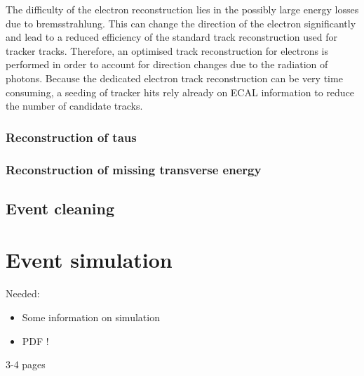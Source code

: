 The difficulty of the electron reconstruction lies in the possibly large energy losses due to bremsstrahlung.
This can change the direction of the electron significantly and lead to a reduced efficiency of the standard track reconstruction used for tracker tracks.
Therefore, an optimised track reconstruction for electrons is performed in order to account for direction changes due to the radiation of photons.
Because the dedicated electron track reconstruction can be very time consuming, a seeding of tracker hits rely already on ECAL information to reduce the number of candidate tracks.


\subsection*{Reconstruction of taus}
\subsection*{Reconstruction of missing transverse energy}
\section*{Event cleaning}




\FloatBarrier
\chapter{Event simulation}

Needed:
\begin{itemize}
\item Some information on simulation
\item PDF !
\end{itemize}

3-4 pages
